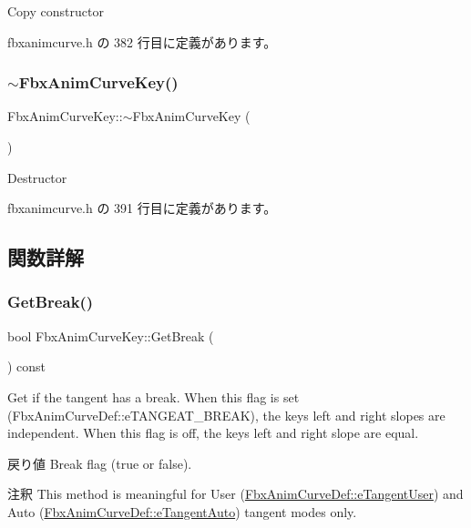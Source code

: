 Copy constructor 

 fbxanimcurve.\+h の 382 行目に定義があります。

\mbox{\label{class_fbx_anim_curve_key_af0269dd6206c85565ed29b01b39df8ff}} 
\subsubsection{\texorpdfstring{$\sim$\+Fbx\+Anim\+Curve\+Key()}{~FbxAnimCurveKey()}}
{\footnotesize\ttfamily Fbx\+Anim\+Curve\+Key\+::$\sim$\+Fbx\+Anim\+Curve\+Key (\begin{DoxyParamCaption}{ }\end{DoxyParamCaption})\hspace{0.3cm}{\ttfamily [inline]}}

Destructor 

 fbxanimcurve.\+h の 391 行目に定義があります。



\subsection{関数詳解}
\mbox{\label{class_fbx_anim_curve_key_a3cf927120c152c7a5d8ac258ad7ebc88}} 
\subsubsection{\texorpdfstring{Get\+Break()}{GetBreak()}}
{\footnotesize\ttfamily bool Fbx\+Anim\+Curve\+Key\+::\+Get\+Break (\begin{DoxyParamCaption}{ }\end{DoxyParamCaption}) const\hspace{0.3cm}{\ttfamily [inline]}}

Get if the tangent has a break. When this flag is set (Fbx\+Anim\+Curve\+Def\+::e\+T\+A\+N\+G\+E\+A\+T\+\_\+\+B\+R\+E\+AK), the key\textquotesingle{}s left and right slopes are independent. When this flag is off, the key\textquotesingle{}s left and right slope are equal. \begin{DoxyReturn}{戻り値}
Break flag ({\ttfamily true} or {\ttfamily false}). 
\end{DoxyReturn}
\begin{DoxyRemark}{注釈}
This method is meaningful for User (\hyperlink{class_fbx_anim_curve_def_ac810ccc5ca0527704ab5175479964b87a199cb16b2c861b12c334093ce796cb86}{Fbx\+Anim\+Curve\+Def\+::e\+Tangent\+User}) and Auto (\hyperlink{class_fbx_anim_curve_def_ac810ccc5ca0527704ab5175479964b87a56e3bad364851277281e94e81327dd25}{Fbx\+Anim\+Curve\+Def\+::e\+Tangent\+Auto}) tangent modes only. 
\end{DoxyRemark}


